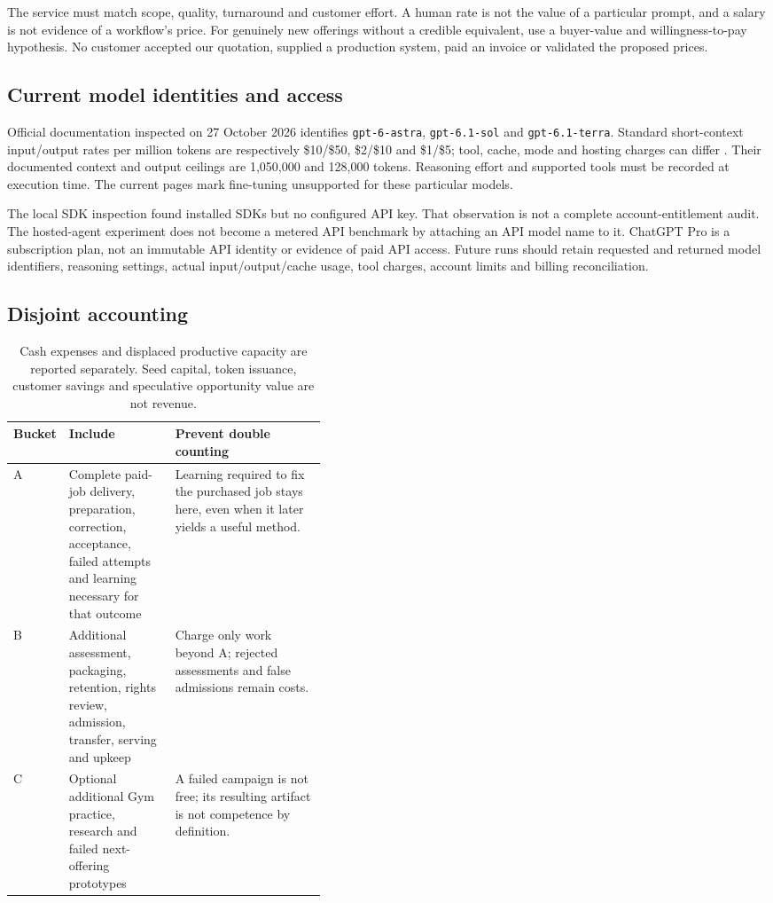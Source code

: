 \documentclass[11pt,letterpaper]{article}
\begin{document}
The service must match scope, quality, turnaround and customer effort. A human rate is not the value of a particular prompt, and a salary is not evidence of a workflow's price. For genuinely new offerings without a credible equivalent, use a buyer-value and willingness-to-pay hypothesis. No customer accepted our quotation, supplied a production system, paid an invoice or validated the proposed prices.

\subsection{Current model identities and access}
Official documentation inspected on 27 October 2026 identifies \texttt{gpt-6-astra}, \texttt{gpt-6.1-sol} and \texttt{gpt-6.1-terra}. Standard short-context input/output rates per million tokens are respectively \$10/\$50, \$2/\$10 and \$1/\$5; tool, cache, mode and hosting charges can differ \cite{astra,sol,terra,pricing}. Their documented context and output ceilings are 1,050,000 and 128,000 tokens. Reasoning effort and supported tools must be recorded at execution time. The current pages mark fine-tuning unsupported for these particular models.

The local SDK inspection found installed SDKs but no configured API key. That observation is not a complete account-entitlement audit. The hosted-agent experiment does not become a metered API benchmark by attaching an API model name to it. ChatGPT Pro is a subscription plan, not an immutable API identity or evidence of paid API access. Future runs should retain requested and returned model identifiers, reasoning settings, actual input/output/cache usage, tool charges, account limits and billing reconciliation.

\subsection{Disjoint accounting}
\begin{table}[H]\small
\begin{tabularx}{\linewidth}{@{}p{0.07\linewidth}p{0.34\linewidth}X@{}}\toprule
Bucket & Include & Prevent double counting \\ \midrule
A & Complete paid-job delivery, preparation, correction, acceptance, failed attempts and learning necessary for that outcome & Learning required to fix the purchased job stays here, even when it later yields a useful method. \\
B & Additional assessment, packaging, retention, rights review, admission, transfer, serving and upkeep & Charge only work beyond A; rejected assessments and false admissions remain costs. \\
C & Optional additional Gym practice, research and failed next-offering prototypes & A failed campaign is not free; its resulting artifact is not competence by definition. \\ \bottomrule
\end{tabularx}
\caption{Cash expenses and displaced productive capacity are reported separately. Seed capital, token issuance, customer savings and speculative opportunity value are not revenue.}
\end{table}
\end{document}
